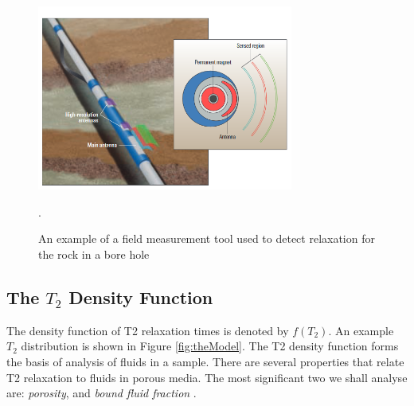 \begin{figure}[htb]
    \centering
    \includegraphics[width=0.75\textwidth]{backgroundImages/example_of_tool}
    \caption{An example of a field measurement tool used to detect relaxation for the rock in a bore hole \cite{nmr_picture_tool}}.
    \label{fig:example_field_tool}
\end{figure}



\subsection{The $T_2$ Density Function}
The density function of T2 relaxation times is denoted by $f(T_2)$. An example $T_2$ distribution is shown in Figure \ref{fig:theModel}. The T2 density function forms the basis of analysis of fluids in a sample. There are several properties that relate T2 relaxation to fluids in porous media. The most significant two we shall analyse are: \textit{porosity}, and \textit{bound fluid fraction} \cite{NMRForRockskleinberg1993nuclear} \cite{wellLoggingBook}.

